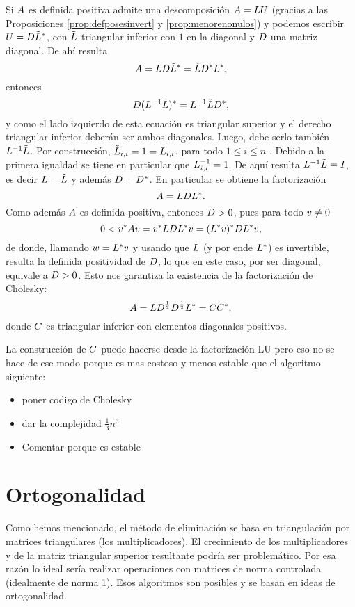 \begin{tcolorbox}
Si $\Ab$ es definida positiva  admite una descomposición $\Ab=\Lb\Ub$ (gracias a las Proposiciones \ref{prop:defposesinvert} y \ref{prop:menorenonulos}) y
podemos escribir  $\Ub=\Db\tilde \Lb^*$, con $\tilde \Lb$ triangular inferior con $1$ en la diagonal y $\Db$ una matriz diagonal. De ahí resulta
$$
\Ab=\Lb\Db\tilde{ \Lb}^*=\tilde \Lb\Db^*\Lb^*,
$$
entonces
$$
\Db(\Lb^{-1}\tilde{ \Lb})^* = \Lb^{-1}\tilde \Lb\Db^*,
$$
y como el lado izquierdo de esta ecuación es triangular superior y el derecho triangular inferior deberán ser ambos diagonales. Luego, debe serlo también $\Lb^{-1}\tilde \Lb$. Por construcción, $\tilde\Lb_{i,i}=1=\Lb_{i,i}$, para todo $1\le i\le n$ . Debido a la primera igualdad se tiene en particular que
$\Lb^{-1}_{i,i}=1$. De aquí resulta
$\Lb^{-1}\tilde \Lb=\Ib$, es decir
$\Lb=\tilde \Lb$ y además $\Db=\Db^*$.
En particular se obtiene la factorización
$$
\Ab=\Lb\Db\Lb^*.
$$
Como además $\Ab$ es definida positiva, entonces $\Db>0$, pues para todo $\vb\neq 0$
$$
0<\vb^*\Ab\vb=\vb^*\Lb\Db\Lb^*\vb=
(\Lb^*\vb)^*\Db\Lb^*\vb,
$$
de donde, llamando $\wb=\Lb^*\vb$ y usando que $\Lb$ (y por ende $\Lb^*$) es invertible, resulta la definida positividad de $\Db$, lo que en este caso, por ser diagonal, equivale a $\Db>0$. Esto nos garantiza la existencia de la factorización de Cholesky:
$$
\Ab=\Lb\Db^{\frac{1}{2}}\Db^{\frac{1}{2}}\Lb^*=\Cb\Cb^*,
$$
donde $\Cb$ es triangular inferior con elementos diagonales positivos.

La construcción de $\Cb$ puede hacerse desde la factorización LU pero eso no se hace de ese modo porque es mas costoso y menos estable que el algoritmo siguiente:

\begin{itemize}
 \item poner codigo de Cholesky
 \item dar  la complejidad $\frac{1}{3}n^3$
 \item Comentar porque es estable-
\end{itemize}



\section{Ortogonalidad}

Como hemos mencionado, el método de eliminación se basa en triangulación por matrices triangulares (los multiplicadores).
El crecimiento de los  multiplicadores y de la matriz triangular superior resultante podría ser problemático.  Por esa razón lo ideal sería realizar operaciones con matrices de norma controlada (idealmente de norma 1). Esos algoritmos son posibles y se basan en ideas de ortogonalidad.




\end{tcolorbox}
